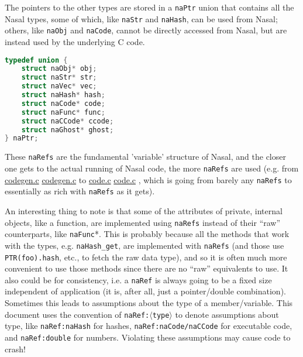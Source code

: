 \documentclass{article}
\newcommand{\comment}[1]{}%
\newcommand{\type}[1]{\textcolor{type}{\tt #1}}
\newcommand{\func}[1]{\textcolor{func}{\tt #1}}
\newcommand{\localmacro}[1]{\textcolor{func}{\tt #1}}
\newcommand{\nasalsourcefile}[2][]{%
  \ifthenelse{\isempty{#1}}%
    {%
      \textcolor{source}{%
        \href{https://github.com/andyross/nasal/blob/master/src/#2}{#2}%
      }%
    }%
    {%
      \textcolor{source}{%
        \href{https://github.com/andyross/nasal/blob/master/src/#2\#L#1}{#2}%
      }%
    }%
}
\begin{document}
The pointers to the other types are stored in a \type{naPtr} union that contains all the Nasal types, some of which, like \type{naStr} and \type{naHash}, can be used from Nasal; others, like \type{naObj} and \type{naCode}, cannot be directly accessed from Nasal, but are instead used by the underlying C code.
\begin{lstlisting}[language=C]
typedef union {
    struct naObj* obj;
    struct naStr* str;
    struct naVec* vec;
    struct naHash* hash;
    struct naCode* code;
    struct naFunc* func;
    struct naCCode* ccode;
    struct naGhost* ghost;
} naPtr;
\end{lstlisting}

These \type{naRefs} are the fundamental 'variable' structure of Nasal, and the closer one gets to the actual running of Nasal code, the more \type{naRefs} are used (e.g. from \nasalsourcefile{codegen.c} to \nasalsourcefile{code.c}, which is going from barely any \type{naRefs} to essentially as rich with \type{naRefs} as it gets).

An interesting thing to note is that some of the attributes of private, internal objects, like a function, are implemented using \type{naRefs} instead of their ``raw'' counterparts, like \type{naFunc}*.  This is probably because all the methods that work with the types, e.g. \func{naHash\_get}, are implemented with \type{naRefs} (and those use \func{PTR(foo).hash}, etc., to fetch the raw data type), and so it is often much more convenient to use those methods since there are no ``raw'' equivalents to use.  It also could be for consistency, i.e. a \type{naRef} is always going to be a fixed size independent of application (it is, after all, just a pointer/double combination).  Sometimes this leads to assumptions about the type of a member/variable.  This document uses the convention of \type{naRef:$\langle$type$\rangle$} to denote assumptions about type, like \type{naRef:naHash} for hashes, \type{naRef:naCode/naCCode} for executable code, and \type{naRef:double} for numbers.  Violating these assumptions may cause code to crash!

\comment{The point of having naHash, naVec, naCode, naFunc and naGhost wrappers for the various lower level structures such as VecRec (for naVec) or HashRec (for naHash) is adding meta information, such as GC related fields, to each Nasal type, including the common \localmacro{GC\_HEADER} macro that is used by all Nasal types as the very first field.}
\end{document}
